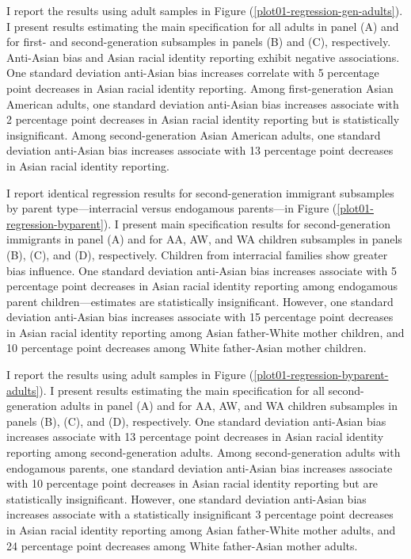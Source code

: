 I report the results using adult samples in Figure (\ref{plot01-regression-gen-adults}). I present results estimating the main specification for all adults in panel (A) and for first- and second-generation subsamples in panels (B) and (C), respectively. Anti-Asian bias and Asian racial identity reporting exhibit negative associations. One standard deviation anti-Asian bias increases correlate with 5 percentage point decreases in Asian racial identity reporting. Among first-generation Asian American adults, one standard deviation anti-Asian bias increases associate with 2 percentage point decreases in Asian racial identity reporting but is statistically insignificant. Among second-generation Asian American adults, one standard deviation anti-Asian bias increases associate with 13 percentage point decreases in Asian racial identity reporting. 

I report identical regression results for second-generation immigrant subsamples by parent type—interracial versus endogamous parents—in Figure (\ref{plot01-regression-byparent}). I present main specification results for second-generation immigrants in panel (A) and for AA, AW, and WA children subsamples in panels (B), (C), and (D), respectively. Children from interracial families show greater bias influence. One standard deviation anti-Asian bias increases associate with 5 percentage point decreases in Asian racial identity reporting among endogamous parent children—estimates are statistically insignificant. However, one standard deviation anti-Asian bias increases associate with 15 percentage point decreases in Asian racial identity reporting among Asian father-White mother children, and 10 percentage point decreases among White father-Asian mother children.

I report the results using adult samples in Figure (\ref{plot01-regression-byparent-adults}). I present results estimating the main specification for all second-generation adults in panel (A) and for AA, AW, and WA children subsamples in panels (B), (C), and (D), respectively. One standard deviation anti-Asian bias increases associate with 13 percentage point decreases in Asian racial identity reporting among second-generation adults. Among second-generation adults with endogamous parents, one standard deviation anti-Asian bias increases associate with 10 percentage point decreases in Asian racial identity reporting but are statistically insignificant. However, one standard deviation anti-Asian bias increases associate with a statistically insignificant 3 percentage point decreases in Asian racial identity reporting among Asian father-White mother adults, and 24 percentage point decreases among White father-Asian mother adults.

